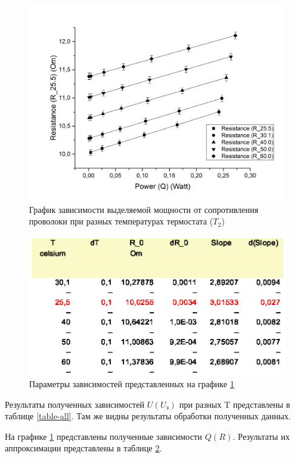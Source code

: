 \documentclass[a4paper,12pt]{article}
\begin{document}
\begin{figure}[ht]
\centering
\includegraphics[width=160mm]{graph1.jpg}
\caption{График зависимости выделяемой мощности от сопротивления проволоки при разных температурах термостата ($T_2$)}
\label{graph-all}
\end{figure}

\begin{figure}[ht]
\centering
\includegraphics[width=140mm]{table3.eps}
\caption{Параметры зависимостей представленных на графике \ref{graph-all}}
\label{table-R0}
\end{figure}

Результаты полученных зависимостей $U(U_\text{э})$ при разных T представлены в таблице \ref{table-all}. Там же видны результаты обработки полученных данных.

На графике \ref{graph-all} представлены полученные зависимости $Q(R)$. Результаты их аппроксимации представлены в таблице \ref{table-R0}.
\end{document}
